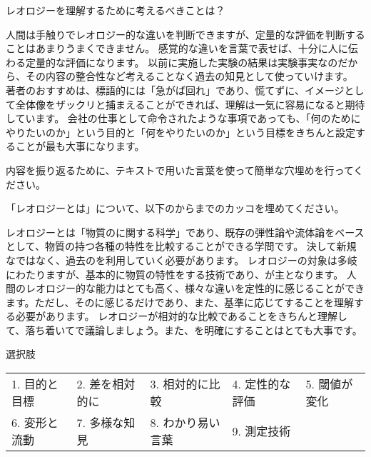 \documentclass[uplatex,dvipdfmx,a4paper,11pt]{jsarticle}
\begin{document}
\begin{qlist}
\begin{qlist2}
    \end{qlist2}
    \vspace{3mm}
	\qitem レオロジーを理解するために考えるべきことは？
		\begin{qlist2}
			\qitem 人間は手触りでレオロジー的な違いを判断できますが、定量的な評価を判断することはあまりうまくできません。
            \qitem 感覚的な違いを言葉で表せば、十分に人に伝わる定量的な評価になります。
            \qitem 以前に実施した実験の結果は実験事実なのだから、その内容の整合性など考えることなく過去の知見として使っていけます。
			\qitem 著者のおすすめは、標語的には「急がば回れ」であり、慌てずに、イメージとして全体像をザックリと捕まえることができれば、理解は一気に容易になると期待しています。
			\qitem 会社の仕事として命令されたような事項であっても、「何のためにやりたいのか」という目的と「何をやりたいのか」という目標をきちんと設定することが最も大事になります。
		\end{qlist2}
\end{qlist}

内容を振り返るために、テキストで用いた言葉を使って簡単な穴埋めを行ってください。

\begin{qparts}
    \qpart 「レオロジーとは」について、以下のからまでのカッコを埋めてください。
    \begin{qlist}
      \qitem レオロジーとは「物質の\qbox{}に関する科学」であり、既存の弾性論や流体論をベースとして、物質の持つ各種の特性を比較することができる学問です。
      決して新規な\qbox{}ではなく、過去の\qbox{}を利用していく必要があります。
      \qitem レオロジーの対象は多岐にわたりますが、基本的に物質の特性を\qbox{}する技術であり、\qbox{}が主となります。
      \qitem 人間のレオロジー的な能力はとても高く、様々な違いを定性的に感じることができます。ただし、その\qbox{}に感じるだけであり、また、基準に応じて\qbox{}することを理解する必要があります。
      \qitem レオロジーが相対的な比較であることをきちんと理解して、落ち着いて\qbox{}で議論しましょう。また、\qbox{}を明確にすることはとても大事です。
    \end{qlist}

    \begin{itembox}[l]{選択肢}
      \begin{center}
        \begin{tabular}{lllll}
                1. 目的と目標&2. 差を相対的に&3. 相対的に比較&4. 定性的な評価 & 5. 閾値が変化 \\
                6. 変形と流動&7. 多様な知見&8. わかり易い言葉 & 9. 測定技術
        \end{tabular}
      \end{center}
    \end{itembox}
\end{qparts}
\end{document}

